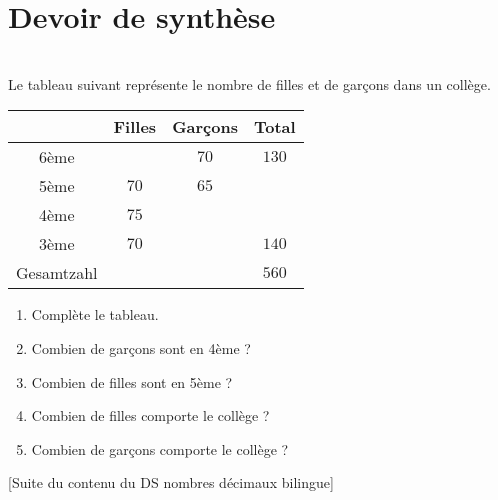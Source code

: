 \documentclass[10pt,openany]{book}
\begin{document}
\section*{Devoir de synthèse}

\begin{multicols}{2}
\\
Le tableau suivant représente le nombre de filles et de garçons dans un collège.
\begin{center}
\begin{tabular}{|c|c|c|c|}
\cline{2-4}
\multicolumn{1}{l|}{}&Filles&Garçons&Total\\
\hline
6ème&&$70$&$130$\\
\hline
5ème&$70$&$65$&\\ 
\hline
4ème&$75$&&\\
\hline 
3ème&$70$&&$140$\\
\hline
Gesamtzahl&&&$560$\\
\hline
\end{tabular}
\end{center}

\begin{enumerate}
\item Complète le tableau.
\item Combien de garçons sont en 4ème ?
\item Combien de filles sont en 5ème ?
\item Combien de filles comporte le collège ?
\item Combien de garçons comporte le collège ?
\end{enumerate}

\columnbreak

\end{multicols}

[Suite du contenu du DS nombres décimaux bilingue]
\end{document}
